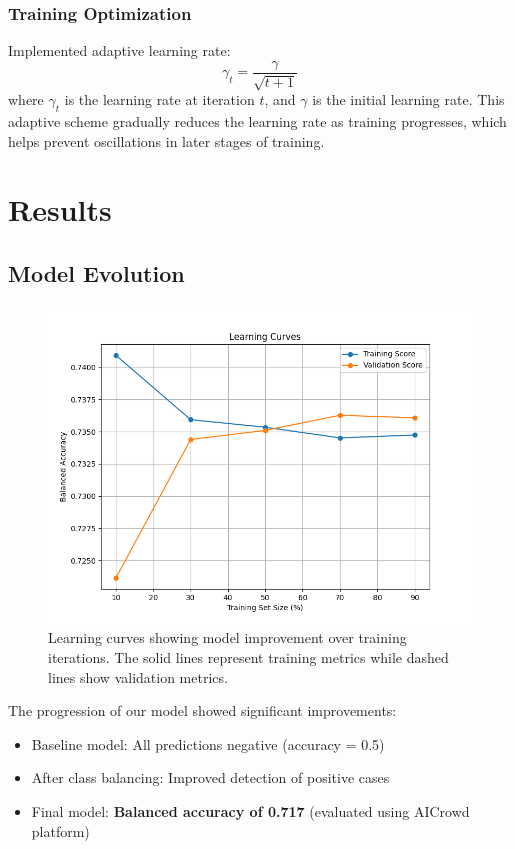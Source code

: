 \documentclass[10pt,conference,compsocconf]{IEEEtran}
\begin{document}
\subsubsection{Training Optimization}
Implemented adaptive learning rate:
\begin{equation}
    \gamma_t = \frac{\gamma}{\sqrt{t + 1}}
\end{equation}
where $\gamma_t$ is the learning rate at iteration $t$, and $\gamma$ is the
initial learning rate. This adaptive scheme gradually reduces the learning rate as
training progresses, which helps prevent oscillations in later stages of training.

\section{Results}

\subsection{Model Evolution}
\begin{figure}[H]
    \centering
    \includegraphics[width=0.95\columnwidth]{figures/learning_curves.png}
    \caption{Learning curves showing model improvement over training iterations.
    The solid lines represent training metrics while dashed lines show validation metrics.}
    \label{fig:learning}
\end{figure}

The progression of our model showed significant improvements:
\begin{itemize}
    \item Baseline model: All predictions negative (accuracy = 0.5)
    \item After class balancing: Improved detection of positive cases
    \item Final model: \textbf{Balanced accuracy of 0.717} (evaluated using AICrowd platform)
\end{itemize}
\end{document}
